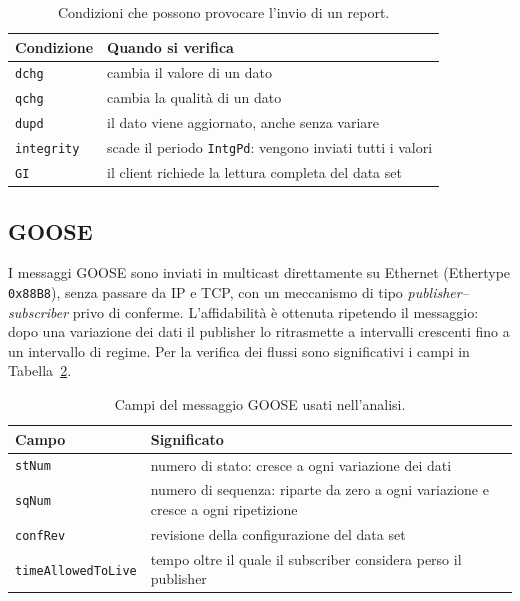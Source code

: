 \documentclass[11pt,a4paper,italian,oneside,openany]{book}
\begin{document}
\begin{table}[ht]
\centering
\begin{tabular}{@{}lp{9cm}@{}}
\toprule
Condizione & Quando si verifica \\
\midrule
\texttt{dchg} & cambia il valore di un dato \\
\texttt{qchg} & cambia la qualità di un dato \\
\texttt{dupd} & il dato viene aggiornato, anche senza variare \\
\texttt{integrity} & scade il periodo \texttt{IntgPd}: vengono inviati tutti i valori \\
\texttt{GI} & il client richiede la lettura completa del data set \\
\bottomrule
\end{tabular}
\caption{Condizioni che possono provocare l'invio di un report.}
\label{tab:trigger}
\end{table}

\subsection{GOOSE}
I messaggi GOOSE sono inviati in multicast direttamente su Ethernet (Ethertype \texttt{0x88B8}), senza passare da IP e TCP, con un meccanismo di tipo \textit{publisher--subscriber} privo di conferme. L'affidabilità è ottenuta ripetendo il messaggio: dopo una variazione dei dati il publisher lo ritrasmette a intervalli crescenti fino a un intervallo di regime. Per la verifica dei flussi sono significativi i campi in Tabella~\ref{tab:goose}.

\begin{table}[ht]
\centering
\begin{tabular}{@{}lp{9cm}@{}}
\toprule
Campo & Significato \\
\midrule
\texttt{stNum} & numero di stato: cresce a ogni variazione dei dati \\
\texttt{sqNum} & numero di sequenza: riparte da zero a ogni variazione e cresce a ogni ripetizione \\
\texttt{confRev} & revisione della configurazione del data set \\
\texttt{timeAllowedToLive} & tempo oltre il quale il subscriber considera perso il publisher \\
\bottomrule
\end{tabular}
\caption{Campi del messaggio GOOSE usati nell'analisi.}
\label{tab:goose}
\end{table}
\end{document}
